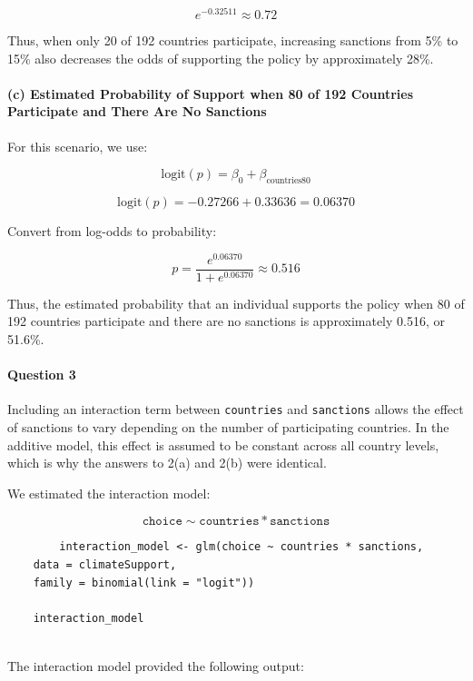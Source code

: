 \documentclass[12pt,letterpaper]{article}
\begin{document}
\[
e^{-0.32511} \approx 0.72
\]

Thus, when only 20 of 192 countries participate, increasing sanctions from 5\% to 15\% also decreases the odds of supporting the policy by approximately 28\%.

\paragraph{(c) Estimated Probability of Support 
	when 80 of 192 Countries Participate and There Are No Sanctions}

For this scenario, we use:

\[
\text{logit}(p) = \beta_0 + \beta_{\text{countries80}}
\]

\[
\text{logit}(p) = -0.27266 + 0.33636 = 0.06370
\]

Convert from log-odds to probability:

\[
p = \frac{e^{0.06370}}{1 + e^{0.06370}} \approx 0.516
\]

Thus, the estimated probability that an individual supports the policy when 80 of 192 countries participate and there are no sanctions is approximately 0.516, or 51.6\%.

\vspace{2cm}


\paragraph{Question 3}

Including an interaction term between \texttt{countries} and \texttt{sanctions} allows the effect of sanctions to vary depending on the number of participating countries. In the additive model, this effect is assumed to be constant across all country levels, which is why the answers to 2(a) and 2(b) were identical.

We estimated the interaction model:

\[
\texttt{choice} \sim \texttt{countries} * \texttt{sanctions}
\]


\begin{BVerbatim}
		interaction_model <- glm(choice ~ countries * sanctions,
	data = climateSupport,
	family = binomial(link = "logit"))
	
	interaction_model
	
\end{BVerbatim}

The interaction model provided the following output:
\end{document}
